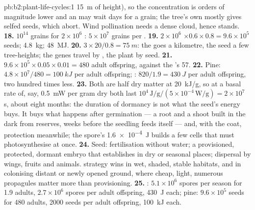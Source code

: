 \begin{solution}{pb:b2:plant-life-cycles:1}
\qty{15}{m} of height), so the concentration is orders of magnitude
lower and an  may wait days for a grain; the tree's own 
mostly gives selfed seeds, which abort. Wind pollination needs a
dense cloud, hence stands.
\textbf{18.} $10^{14}$ grains for $2\times 10^{6}$ : $5\times
10^{7}$ grains per .
\textbf{19.} $2\times 10^{6}$  $\times 0.6\times 0.8 = 9.6\times
10^{5}$ seeds; \qty{4.8}{kg}; \qty{48}{MJ}.
\textbf{20.} $3\times 20/0.8 = \qty{75}{m}$: the  goes a
kilometre, the seed a few tree-heights; the genes travel by ,
the plant by seed.
\textbf{21.} $9.6\times 10^{5}\times 0.05\times 0.01 = 480$ adult
offspring, against the 's 57.
\textbf{22.} Pine: $4.8\times 10^{7}/480 = \qty{100}{kJ}$ per adult
offspring; : $820/1.9 = \qty{430}{J}$ per adult offspring, two
hundred times less.
\textbf{23.} Both are half dry matter at \qty{20}{kJ/g}, so at a
basal rate of, say, \qty{0.5}{mW} per gram dry both last $10^{4}\,
\text{J/g}/(5\times 10^{-4}\,\text{W/g}) = 2\times 10^{7}$ s, about
eight months: the duration of dormancy is not what the seed's energy
buys. It buys what happens after germination --- a root and a shoot
built in the dark from reserves, weeks before the seedling feeds
itself --- and, with the coat, protection meanwhile; the spore's
\qty{1.6e-4}{J} builds a few cells that must photosynthesise at once.
\textbf{24.} Seed: fertilisation without water; a provisioned,
protected, dormant embryo that establishes in dry or seasonal
places; dispersal by wings, fruits and animals.  strategy wins
in wet, shaded, stable habitats, and in colonising distant or newly
opened ground, where cheap, light, numerous propagules matter more
than provisioning.
\textbf{25.} : $5.1\times 10^{6}$ spores per season for 1.9 adults,
$2.7\times 10^{6}$ spores per adult offspring, \qty{430}{J} each;
pine: $9.6\times 10^{5}$ seeds for 480 adults, \num{2000} seeds per
adult offspring, \qty{100}{kJ} each.
\end{solution}
